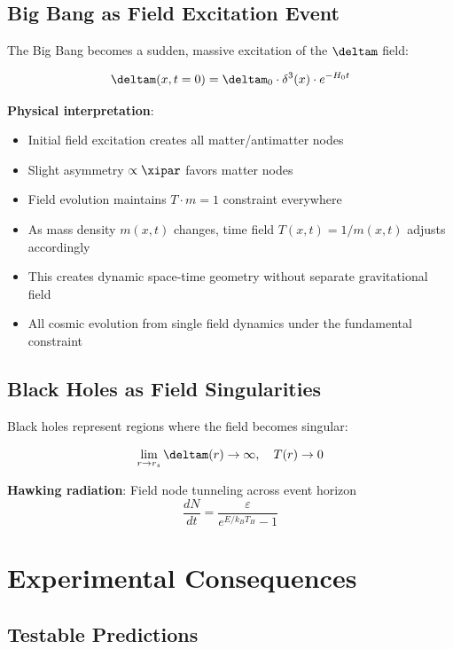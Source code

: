 	\subsection{Big Bang as Field Excitation Event}
	
	The Big Bang becomes a sudden, massive excitation of the $\deltam$ field:
	
	\begin{equation}
		\deltam(x,t=0) = \deltam_0 \cdot \delta^3(x) \cdot e^{-H_0 t}
	\end{equation}
	
	\textbf{Physical interpretation}:
	\begin{itemize}
		\item Initial field excitation creates all matter/antimatter nodes
		\item Slight asymmetry $\propto \xipar$ favors matter nodes
		\item Field evolution maintains $T \cdot m = 1$ constraint everywhere
		\item As mass density $m(x,t)$ changes, time field $T(x,t) = 1/m(x,t)$ adjusts accordingly
		\item This creates dynamic space-time geometry without separate gravitational field
		\item All cosmic evolution from single field dynamics under the fundamental constraint
	\end{itemize}
	
	\subsection{Black Holes as Field Singularities}
	
	Black holes represent regions where the field becomes singular:
	
	\begin{equation}
		\lim_{r \to r_s} \deltam(r) \to \infty, \quad T(r) \to 0
	\end{equation}
	
	\textbf{Hawking radiation}: Field node tunneling across event horizon
	\begin{equation}
		\frac{dN}{dt} = \frac{\varepsilon}{e^{E/k_B T_H} - 1}
	\end{equation}
	
	\section{Experimental Consequences}
	
	\subsection{Testable Predictions}
	
